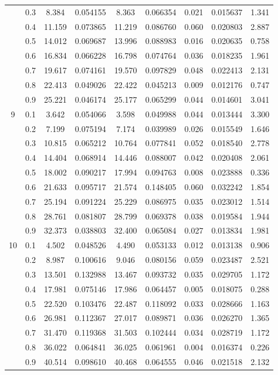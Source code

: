 \begin{longtable}{ | c | c || c | c | c | c | c | c | c | }
 & 0.3 & 8.384 & 0.054155 & 8.363 & 0.066354 & 0.021 & 0.015637 & 1.341 \\
 & 0.4 & 11.159 & 0.073865 & 11.219 & 0.086760 & 0.060 & 0.020803 & 2.887 \\
 & 0.5 & 14.012 & 0.069687 & 13.996 & 0.088983 & 0.016 & 0.020635 & 0.758 \\
 & 0.6 & 16.834 & 0.066228 & 16.798 & 0.074764 & 0.036 & 0.018235 & 1.961 \\
 & 0.7 & 19.617 & 0.074161 & 19.570 & 0.097829 & 0.048 & 0.022413 & 2.131 \\
 & 0.8 & 22.413 & 0.049026 & 22.422 & 0.045213 & 0.009 & 0.012176 & 0.747 \\
 & 0.9 & 25.221 & 0.046174 & 25.177 & 0.065299 & 0.044 & 0.014601 & 3.041 \\
 \hline
\multirow{9}{*}{9} & 0.1 & 3.642 & 0.054066 & 3.598 & 0.049988 & 0.044 & 0.013444 & 3.300 \\
 & 0.2 & 7.199 & 0.075194 & 7.174 & 0.039989 & 0.026 & 0.015549 & 1.646 \\
 & 0.3 & 10.815 & 0.065212 & 10.764 & 0.077841 & 0.052 & 0.018540 & 2.778 \\
 & 0.4 & 14.404 & 0.068914 & 14.446 & 0.088007 & 0.042 & 0.020408 & 2.061 \\
 & 0.5 & 18.002 & 0.090217 & 17.994 & 0.094763 & 0.008 & 0.023888 & 0.336 \\
 & 0.6 & 21.633 & 0.095717 & 21.574 & 0.148405 & 0.060 & 0.032242 & 1.854 \\
 & 0.7 & 25.194 & 0.091224 & 25.229 & 0.086975 & 0.035 & 0.023012 & 1.514 \\
 & 0.8 & 28.761 & 0.081807 & 28.799 & 0.069378 & 0.038 & 0.019584 & 1.944 \\
 & 0.9 & 32.373 & 0.038803 & 32.400 & 0.065084 & 0.027 & 0.013834 & 1.981 \\
 \hline
\multirow{9}{*}{10} & 0.1 & 4.502 & 0.048526 & 4.490 & 0.053133 & 0.012 & 0.013138 & 0.906 \\
 & 0.2 & 8.987 & 0.100616 & 9.046 & 0.080156 & 0.059 & 0.023487 & 2.521 \\
 & 0.3 & 13.501 & 0.132988 & 13.467 & 0.093732 & 0.035 & 0.029705 & 1.172 \\
 & 0.4 & 17.981 & 0.075146 & 17.986 & 0.064457 & 0.005 & 0.018075 & 0.288 \\
 & 0.5 & 22.520 & 0.103476 & 22.487 & 0.118092 & 0.033 & 0.028666 & 1.163 \\
 & 0.6 & 26.981 & 0.112367 & 27.017 & 0.089871 & 0.036 & 0.026270 & 1.365 \\
 & 0.7 & 31.470 & 0.119368 & 31.503 & 0.102444 & 0.034 & 0.028719 & 1.172 \\
 & 0.8 & 36.022 & 0.064841 & 36.025 & 0.061961 & 0.004 & 0.016374 & 0.226 \\
 & 0.9 & 40.514 & 0.098610 & 40.468 & 0.064555 & 0.046 & 0.021518 & 2.132 \\
 \hline
\hline
\end{longtable}
 
